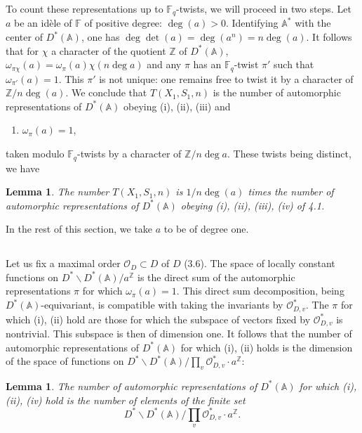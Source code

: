 \documentclass[11pt,a4paper]{article}
\theoremstyle{plain}
\newtheorem{lemma}[theorem]{Lemma}
\theoremstyle{definition}
\newcommand{\Fq}{\mathbb{F}_q}
\newcommand{\Z}{\mathbb{Z}}
\begin{document}
To count these representations up to $\Fq$-twists, we will proceed in two steps. Let $a$ be an id\`ele of $\mathbb{F}$ of positive degree: $\deg(a) > 0$. Identifying $\mathbb{A}^*$ with the center of $D^*(\mathbb{A})$, one has $\deg \det(a) = \deg(a^n) = n\deg(a)$. It follows that for $\chi$ a character of the quotient $\Z$ of $D^*(\mathbb{A})$, $\omega_{\pi\chi}(a) = \omega_\pi(a) \chi(n\deg a)$ and any $\pi$ has an $\Fq$-twist $\pi'$ such that $\omega_{\pi'}(a) = 1$. This $\pi'$ is not unique: one remains free to twist it by a character of $\Z/n\deg(a)$. We conclude that $T(X_1,S_1,n)$ is the number of automorphic representations of $D^*(\mathbb{A})$ obeying (i), (ii), (iii) and
\begin{enumerate}
\item[(iv)] $\omega_\pi(a) = 1$,
\end{enumerate}
taken modulo $\Fq$-twists by a character of $\Z/n\deg a$. These twists being distinct, we have

\begin{lemma}
The number $T(X_1,S_1,n)$ is $1/n\deg(a)$ times the number of automorphic representations of $D^*(\mathbb{A})$ obeying (i), (ii), (iii), (iv) of 4.1.
\end{lemma}

In the rest of this section, we take $a$ to be of degree one.

\subsection{}
Let us fix a maximal order $\mathcal{O}_D \subset D$ of $D$ (3.6). The space of locally constant functions on $D^* \backslash D^*(\mathbb{A}) / a^{\Z}$ is the direct sum of the automorphic representations $\pi$ for which $\omega_\pi(a) = 1$. This direct sum decomposition, being $D^*(\mathbb{A})$-equivariant, is compatible with taking the invariants by $\mathcal{O}_{D,v}^*$. The $\pi$ for which (i), (ii) hold are those for which the subspace of vectors fixed by $\mathcal{O}_{D,v}^*$ is nontrivial. This subspace is then of dimension one. It follows that the number of automorphic representations of $D^*(\mathbb{A})$ for which (i), (ii) holds is the dimension of the space of functions on $D^* \backslash D^*(\mathbb{A}) / \prod_v \mathcal{O}_{D,v}^* \cdot a^{\Z}$:

\begin{lemma}
The number of automorphic representations of $D^*(\mathbb{A})$ for which (i), (ii), (iv) hold is the number of elements of the finite set
\begin{equation}
D^* \backslash D^*(\mathbb{A}) / \prod_v \mathcal{O}_{D,v}^* \cdot a^{\Z}. \tag{4.4.1}
\end{equation}
\end{lemma}
\end{document}
